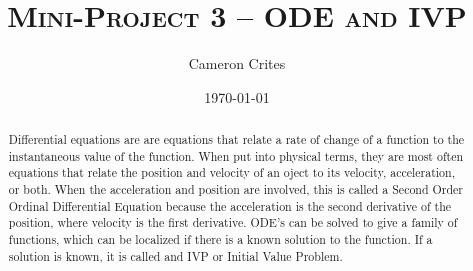 \documentclass[10pt]{article}
\title{\textsc{Mini-Project 3 -- ODE and IVP}}
\author{Cameron Crites}
\date{\today}
\begin{document}
\maketitle
\begin{abstract}
Differential equations are are equations that relate a rate of change of a function to the instantaneous value of the function. When put into physical terms, they are most often equations that relate the position and velocity of an oject to its velocity, acceleration, or both. When the acceleration and position are involved, this is called a Second Order Ordinal Differential Equation because the acceleration is the second derivative of the position, where velocity is the first derivative. ODE's can be solved to give a family of functions, which can be localized if there is a known solution to the function. If a solution is known, it is called and IVP or Initial Value Problem.
\end{abstract}
\pagebreak
\end{document}

